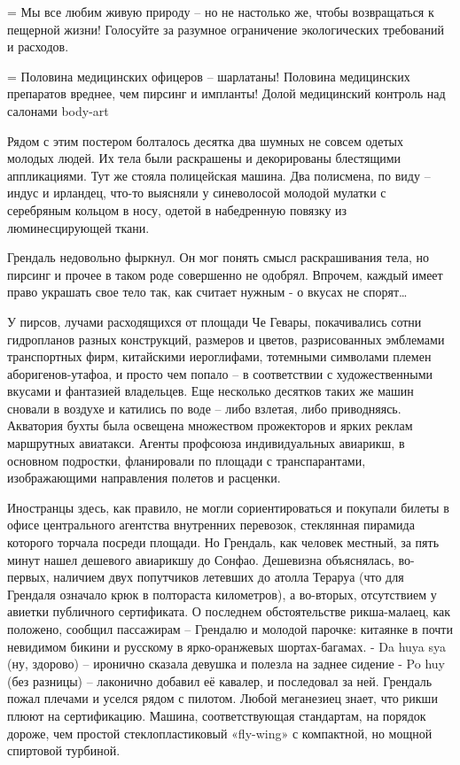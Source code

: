 \documentclass{book}
\begin{document}
= Мы все любим живую природу -- но не настолько же, чтобы возвращаться к пещерной жизни! Голосуйте за разумное ограничение экологических требований и расходов.

= Половина медицинских офицеров -- шарлатаны! Половина медицинских препаратов вреднее, чем пирсинг и импланты! Долой медицинский контроль над салонами body-art

Рядом с этим постером болталось десятка два шумных не совсем одетых молодых людей. Их тела были раскрашены и декорированы блестящими аппликациями. Тут же стояла полицейская машина. Два полисмена, по виду -- индус и ирландец, что-то выясняли у синеволосой молодой мулатки с серебряным кольцом в носу, одетой в набедренную повязку из люминесцирующей ткани.

Грендаль недовольно фыркнул. Он мог понять смысл раскрашивания тела, но пирсинг и прочее в таком роде совершенно не одобрял. Впрочем, каждый имеет право украшать свое тело так, как считает нужным - о вкусах не спорят\ldots{}

У пирсов, лучами расходящихся от площади Че Гевары, покачивались сотни гидропланов разных конструкций, размеров и цветов, разрисованных эмблемами транспортных фирм, китайскими иероглифами, тотемными символами племен аборигенов-утафоа, и просто чем попало -- в соответствии с художественными вкусами и фантазией владельцев. Еще несколько десятков таких же машин сновали в воздухе и катились по воде -- либо взлетая, либо приводняясь. Акватория бухты была освещена множеством прожекторов и ярких реклам маршрутных авиатакси. Агенты профсоюза индивидуальных авиарикш, в основном подростки, фланировали по площади с транспарантами, изображающими направления полетов и расценки.

Иностранцы здесь, как правило, не могли сориентироваться и покупали билеты в офисе центрального агентства внутренних перевозок, стеклянная пирамида которого торчала посреди площади. Но Грендаль, как человек местный, за пять минут нашел дешевого авиарикшу до Сонфао. Дешевизна объяснялась, во-первых, наличием двух попутчиков летевших до атолла Тераруа (что для Грендаля означало крюк в полтораста километров), а во-вторых, отсутствием у авиетки публичного сертификата. О последнем обстоятельстве рикша-малаец, как положено, сообщил пассажирам -- Грендалю и молодой парочке: китаянке в почти невидимом бикини и русскому в ярко-оранжевых шортах-багамах.
- Da huya sya (ну, здорово) -- иронично сказала девушка и полезла на заднее сидение
- Po huy (без разницы) -- лаконично добавил её кавалер, и последовал за ней.
Грендаль пожал плечами и уселся рядом с пилотом. Любой меганезиец знает, что рикши плюют на сертификацию. Машина, соответствующая стандартам, на порядок дороже, чем простой стеклопластиковый «fly-wing» с компактной, но мощной спиртовой турбиной.
\end{document}
